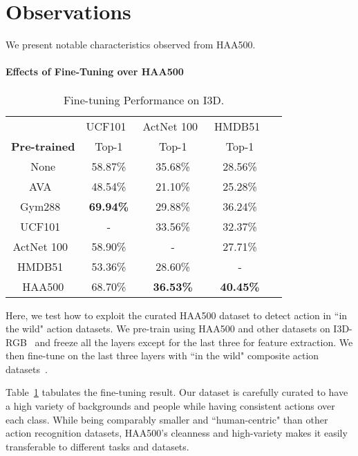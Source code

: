 \documentclass[10pt,twocolumn,letterpaper]{article}
\begin{document}
\section{Observations}
We present notable characteristics observed from HAA500.
\vspace{-1em}

\paragraph{Effects of Fine-Tuning over HAA500}

\begin{table}[t]
{\small 
\begin{center}
\begin{tabular}{|c|c|c|c|c|}
\hline
 & \multicolumn{1}{c|}{UCF101~\cite{ucf101}} & \multicolumn{1}{c|}{ActNet 100~\cite{activitynet}} & HMDB51~\cite{HMDB51} \\
\textbf{Pre-trained} & Top-1  & Top-1 & Top-1 \\
\hline
None                            & 58.87\% & 35.68\% & 28.56\% \\ 
AVA~\cite{AVA}                  & 48.54\% & 21.10\% & 25.28\% \\ 
Gym288~\cite{finegym}           & \textbf{69.94\%} & 29.88\% & 36.24\% \\ 
UCF101~\cite{ucf101}            & -       & 33.56\% & 32.37\% \\ 
ActNet 100~\cite{activitynet}   & 58.90\% & -       & 27.71\% \\
HMDB51~\cite{HMDB51}            & 53.36\% & 28.60\% &  -      \\
\hline
HAA500                          & 68.70\% & \textbf{36.53\%} & \textbf{40.45\%} \\ 
\hline
\end{tabular}
\end{center}}
\caption{Fine-tuning Performance on I3D.}
\label{table:transfer}
\vspace{-1em}
\end{table}



Here, we test how to exploit the curated HAA500 dataset to detect action in ``in the wild" action datasets. We pre-train using HAA500 and other datasets on I3D-RGB~\cite{i3d} and freeze all the layers except for the last three for feature extraction. We then fine-tune on the last three layers with ``in the wild" composite action datasets~\cite{activitynet,HMDB51,ucf101}.

Table~\ref{table:transfer} tabulates the fine-tuning result.
Our dataset is carefully curated to have a high variety of backgrounds and people while having consistent actions over each class. While being comparably smaller and ``human-centric" than other action recognition datasets, HAA500's cleanness and high-variety makes it easily transferable to different tasks and datasets. 
\end{document}
